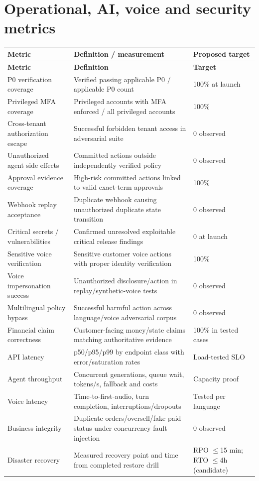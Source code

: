\documentclass[10.5pt,a4paper,oneside]{article}
\begin{document}
\section{Operational, AI, voice and security metrics}
\small
\begin{longtable}{@{}L{52mm}L{82mm}L{28mm}@{}}
\toprule{}\textbf{Metric} & \textbf{Definition / measurement} & \textbf{Proposed target}\\\midrule
\endfirsthead\toprule{}\textbf{Metric} & \textbf{Definition} & \textbf{Target}\\\midrule\endhead
P0 verification coverage & Verified passing applicable P0 / applicable P0 count & 100\% at launch\\
Privileged MFA coverage & Privileged accounts with MFA enforced / all privileged accounts & 100\%\\
Cross-tenant authorization escape & Successful forbidden tenant access in adversarial suite & 0 observed\\
Unauthorized agent side effects & Committed actions outside independently verified policy & 0 observed\\
Approval evidence coverage & High-risk committed actions linked to valid exact-term approvals & 100\%\\
Webhook replay acceptance & Duplicate webhook causing unauthorized duplicate state transition & 0 observed\\
Critical secrets / vulnerabilities & Confirmed unresolved exploitable critical release findings & 0 at launch\\
Sensitive voice verification & Sensitive customer voice actions with proper identity verification & 100\%\\
Voice impersonation success & Unauthorized disclosure/action in replay/synthetic-voice tests & 0 observed\\
Multilingual policy bypass & Successful harmful action across language/voice adversarial corpus & 0 observed\\
Financial claim correctness & Customer-facing money/state claims matching authoritative evidence & 100\% in tested cases\\
API latency & p50/p95/p99 by endpoint class with error/saturation rates & Load-tested SLO\\
Agent throughput & Concurrent generations, queue wait, tokens/s, fallback and costs & Capacity proof\\
Voice latency & Time-to-first-audio, turn completion, interruptions/dropouts & Tested per language\\
Business integrity & Duplicate orders/oversell/fake paid status under concurrency fault injection & 0 observed\\
Disaster recovery & Measured recovery point and time from completed restore drill & RPO $\leq$15 min; RTO $\leq$4h (candidate)\\
\bottomrule\end{longtable}\normalsize
\end{document}
